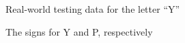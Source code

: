 \documentclass[10pt,Times New Roman]{article}
\begin{document}
        \begin{figure}[h]
            \caption{Real-world testing data for the letter ``Y''}
            \label{fig:y_images}
        \end{figure}

        \begin{figure}[h]
            \caption{The signs for Y and P, respectively}
            \label{fig:ypcompare}
        \end{figure}
\end{document}

